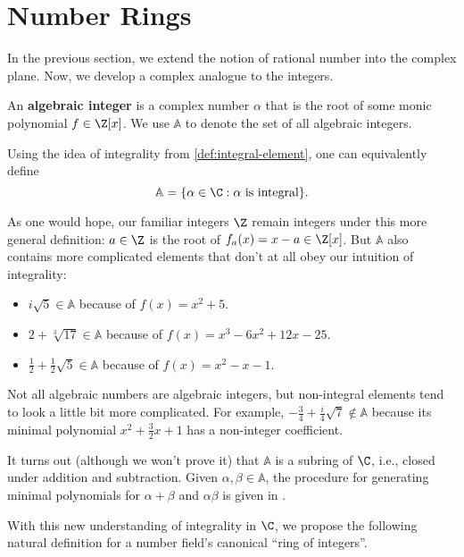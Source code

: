\section{Number Rings}

In the previous section, we extend the notion of rational number into the complex plane. Now, we develop a complex analogue to the integers.

\begin{definition}
    An \textbf{algebraic integer} is a complex number $\alpha$ that is the root of some monic polynomial $f \in \Z[x]$. We use $\mathbb A$ to denote the set of all algebraic integers.

    Using the idea of integrality from \autoref{def:integral-element}, one can equivalently define
    \begin{equation}
        \mathbb A = \{ \alpha \in \C : \text{$\alpha$ is integral} \}.
    \end{equation}
\end{definition}

As one would hope, our familiar integers $\Z$ remain integers under this more general definition: $a \in \Z$ is the root of $f_a(x) = x - a \in \Z[x]$. But $\mathbb A$ also contains more complicated elements that don't at all obey our intuition of integrality:
\begin{itemize}
    \item $i \sqrt 5 \in \mathbb A$ because of $f(x) = x^2 + 5$.
    \item $2 + \sqrt[3]{17} \in \mathbb A$ because of $f(x) = x^3 - 6 x^2 + 12 x - 25$.
    \item $\frac12 + \frac12 \sqrt 5 \in \mathbb A$ because of $f(x) = x^2 - x - 1$.
\end{itemize}
Not all algebraic numbers are algebraic integers, but non-integral elements tend to look a little bit more complicated. For example, $- \frac 3 4 + \frac i 4 \sqrt 7 \not \in \mathbb A$ because its minimal polynomial $x^2 + \frac32x + 1$ has a non-integer coefficient.

It turns out (although we won't prove it) that $\mathbb A$ is a subring of $\C$, i.e., closed under addition and subtraction. Given $\alpha, \beta \in \mathbb A$, the procedure for generating minimal polynomials for $\alpha + \beta$ and $\alpha \beta$ is given in \textcite[12]{marcus}.

With this new understanding of integrality in $\C$, we propose the following natural definition for a number field's canonical ``ring of integers''.

